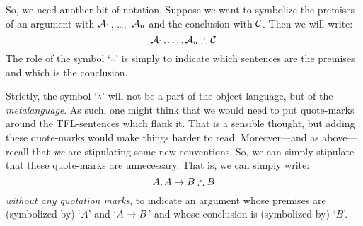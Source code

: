 

So, we need another bit of notation. Suppose we want to symbolize the premises of an argument with $\mathcal{A}_1$, \dots,~$\mathcal{A}_n$ and the conclusion with $\mathcal{C}$. Then we will write:
$$\metav{A}_1, \ldots, \metav{A}_n \therefore \metav{C}$$
The role of the symbol `$\therefore$' is simply to indicate which sentences are the premises and which is the conclusion.


Strictly, the symbol `$\therefore$' will not be a part of the object language, but of the \emph{metalanguage}. As such, one might think that we would need to put quote-marks around the TFL-sentences which flank it. That is a sensible thought, but adding these quote-marks would make things harder to read. Moreover---and as above---recall that \emph{we} are stipulating some new conventions. So, we can simply stipulate that these quote-marks are unnecessary. That is, we can simply write:
$$A, A \eif B \therefore B$$
\emph{without any quotation marks}, to indicate an argument whose premises are (symbolized by) `$A$' and `$A \rightarrow B$' and whose conclusion is (symbolized by) `$B$'.
